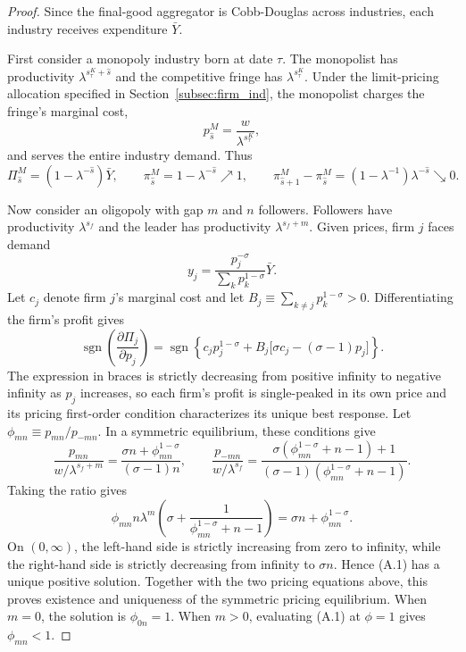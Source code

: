 \documentclass[12pt]{article}
\begin{document}
\begin{proof}
Since the final-good aggregator is Cobb-Douglas across industries, each industry receives expenditure \(\bar Y\).

First consider a monopoly industry born at date \(\tau\). The monopolist has productivity \(\lambda^{s^K_\tau+\hat s}\) and the competitive fringe has \(\lambda^{s^K_\tau}\). Under the limit-pricing allocation specified in Section~\ref{subsec:firm_ind}, the monopolist charges the fringe's marginal cost,
\[ p^M_{\hat s}=\frac{w}{\lambda^{s^K_\tau}}, \]
and serves the entire industry demand. Thus
\[ \Pi^M_{\hat s} = \left(1-\lambda^{-\hat s}\right)\bar Y,
\qquad \pi^M_{\hat s}=1-\lambda^{-\hat s}\nearrow1,
\qquad \pi^M_{\hat{s}+1}-\pi^M_{\hat{s}}=(1-\lambda^{-1})\lambda^{-\hat{s}} \searrow0.\]

Now consider an oligopoly with gap \(m\) and \(n\) followers. Followers have productivity \(\lambda^{s_f}\) and the leader has productivity \(\lambda^{s_f+m}\). Given prices, firm \(j\) faces demand
\[ y_j=\frac{p_j^{-\sigma}}{\sum_k p_k^{1-\sigma}}\bar Y. \]
Let \(c_j\) denote firm \(j\)'s marginal cost and let \(B_j\equiv\sum_{k\neq j}p_k^{1-\sigma}>0\). Differentiating the firm's profit gives
\[
\operatorname{sgn}\!\left(\frac{\partial\Pi_j}{\partial p_j}\right)
=
\operatorname{sgn}\!\left\{
c_jp_j^{1-\sigma}
+
B_j\bigl[\sigma c_j-(\sigma-1)p_j\bigr]
\right\}.
\]
The expression in braces is strictly decreasing from positive infinity to negative infinity as \(p_j\) increases, so each firm's profit is single-peaked in its own price and its pricing first-order condition characterizes its unique best response. Let \(\phi_{mn}\equiv p_{mn}/p_{-mn}\). In a symmetric equilibrium, these conditions give
\[ \frac{p_{mn}}{w/\lambda^{s_f+m}} =
\frac{\sigma n+\phi_{mn}^{1-\sigma}}{(\sigma-1)n}, \qquad
\frac{p_{-mn}}{w/\lambda^{s_f}} = \frac{\sigma(\phi_{mn}^{1-\sigma}+n-1)+1}{(\sigma-1)(\phi_{mn}^{1-\sigma}+n-1)} . \]
Taking the ratio gives
\[ \phi_{mn} n\lambda^m \left( \sigma+\frac{1}{\phi_{mn}^{1-\sigma}+n-1} \right)
= \sigma n+\phi_{mn}^{1-\sigma}. \tag{A.1} \]
On \((0,\infty)\), the left-hand side is strictly increasing from zero to infinity, while the right-hand side is strictly decreasing from infinity to \(\sigma n\). Hence (A.1) has a unique positive solution. Together with the two pricing equations above, this proves existence and uniqueness of the symmetric pricing equilibrium. When \(m=0\), the solution is \(\phi_{0n}=1\). When \(m>0\), evaluating (A.1) at \(\phi=1\) gives \(\phi_{mn}<1\).


\end{proof}
\end{document}
